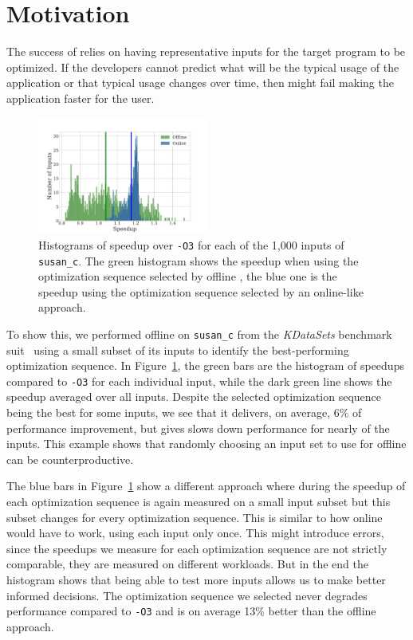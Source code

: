 \section{Motivation}

The success of \itercomp relies on having representative inputs for the target program to be optimized. If the developers cannot predict
what will be the typical usage of the application or that typical usage changes over time, then \itercomp might fail making the application
faster for the user.

\begin{figure}[t!]
    \centering
    \includegraphics[width=0.5\textwidth]{figs/motivation-online.pdf}
    \caption{Histograms of speedup over \texttt{-O3} for each of the 1,000 inputs of \texttt{susan\_c}. The green histogram shows the speedup when using
    the optimization sequence selected by offline \itercomp, the blue one is the speedup using the optimization sequence selected by an
    online-like approach.}
    \label{fig:motivation-online}
\end{figure}

To show this, we performed offline \itercomp on \texttt{susan\_c} from the \textit{KDataSets} benchmark suit~\cite{chen10,chen12a} using a
small subset of its inputs to identify the best-performing optimization sequence. In Figure~\ref{fig:motivation-online}, the green bars are
the histogram of speedups compared to  \texttt{-O3} for each individual input, while the dark green line shows the speedup
averaged over all inputs. Despite the selected optimization sequence being the best for some inputs, we see that it delivers, on average,
6\% of performance improvement, but gives slows down performance for nearly of the inputs. This example shows that randomly choosing an
input set to use for offline \itercomp can be counterproductive.

The blue bars  in
Figure~\ref{fig:motivation-online} show a different approach where during \itercomp the speedup of each optimization sequence is again
measured on a small input subset but this subset changes for every optimization sequence. This is similar to how online \itercomp would
have to work, using each input only once. This might introduce errors, since the speedups we measure for each optimization sequence are not
strictly comparable, they are measured on different workloads. But in the end the histogram shows that being able to test more inputs
allows us to make better informed decisions. The optimization sequence we selected never degrades performance compared to \texttt{-O3} and
is on average 13\% better than the offline approach.

